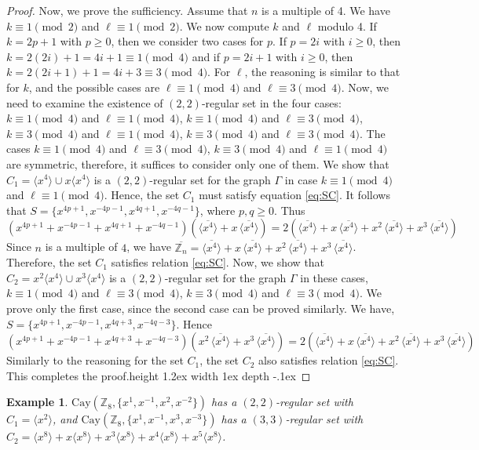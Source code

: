 \documentclass[12pt]{article}
\def\bull{\vrule height 1.2ex width 1ex depth -.1ex }
\newtheorem{example}[formula]{Example}
\begin{document}
\begin{proof}
Now, we prove the sufficiency. Assume that $n$ is a multiple of 4. We have	$k \equiv 1 \pmod{2}$ and $\ell \equiv 1 \pmod{2}$. We now compute $k$ and $\ell$ modulo 4. If  $k = 2p + 1$ with $p \ge 0$, then we consider two cases for $p$.
If $p = 2i$ with $i \ge 0$, then $k = 2(2i) + 1 = 4i + 1 \equiv 1 \pmod{4}$ and if $p = 2i + 1$ with $i \ge 0$, then $k = 2(2i + 1) + 1 = 4i + 3 \equiv 3 \pmod{4}$. For $\ell$, the reasoning is similar to that for $k$, and the possible cases are $\ell \equiv 1 \pmod{4}$ and $\ell \equiv 3 \pmod{4}$. Now, we need to examine the existence of $(2,2)$-regular set in the four cases:\\
$k \equiv 1 \pmod{4}$ and $\ell \equiv 1 \pmod{4}$, $k \equiv 1 \pmod{4}$ and $\ell \equiv 3 \pmod{4}$, $k \equiv 3 \pmod{4}$ and $\ell \equiv 1 \pmod{4}$, $k \equiv 3 \pmod{4}$ and $\ell \equiv 3 \pmod{4}$. The cases  $k \equiv 1 \pmod{4}$ and $\ell \equiv 3 \pmod{4}$, $k \equiv 3 \pmod{4}$ and $\ell \equiv 1 \pmod{4}$ are symmetric, therefore, it suffices to consider only one of them. We show that $C_1 = \langle x^4 \rangle \cup x\langle x^4 \rangle$ is a $(2,2)$-regular set for the graph $\Gamma$ in case $k \equiv 1 \pmod{4}$ and $\ell \equiv 1 \pmod{4}$. Hence, the set $C_1$ must satisfy equation \eqref{eq:SC}. It follows that $S = \{x^{4p+1}, x^{-4p-1}, x^{4q+1}, x^{-4q-1}\}$, where $p,q \ge 0$. Thus
\[
(x^{4p+1} + x^{-4p-1} + x^{4q+1} + x^{-4q-1})
(\overline{\langle x^4 \rangle} + x\,\overline{\langle x^4 \rangle})
= 2 (\overline{\langle x^4 \rangle} + x\,\overline{\langle x^4 \rangle}
+ x^2\,\overline{\langle x^4 \rangle} + x^3\,\overline{\langle x^4 \rangle})
\]
Since $n$ is a multiple of $4$, we have
$\overline{\mathbb{Z}_n}
=
\overline{\langle x^4 \rangle}
+ x\,\overline{\langle x^4 \rangle}
+ x^2\,\overline{\langle x^4 \rangle}
+ x^3\,\overline{\langle x^4 \rangle}$. Therefore, the set $C_1$ satisfies relation \eqref{eq:SC}. Now, we show that $C_2 = x^2\langle x^4\rangle \cup x^3\langle x^4\rangle$ is a $(2,2)$-regular set for the graph $\Gamma$ in these cases,  $k \equiv 1 \pmod{4}$ and $\ell \equiv 3 \pmod{4}$, $k \equiv 3 \pmod{4}$ and $\ell \equiv 3 \pmod{4}$. We prove only the first case, since the second case can be proved similarly. We have, $S = \{x^{4p+1}, x^{-4p-1}, x^{4q+3}, x^{-4q-3}\}$. Hence
\[
(x^{4p+1} + x^{-4p-1} + x^{4q+3} + x^{-4q-3})
(x^2\,\overline{\langle x^4 \rangle} + x^3\,\overline{\langle x^4 \rangle})
= 2 (\overline{\langle x^4 \rangle} + x\,\overline{\langle x^4 \rangle}
+ x^2\,\overline{\langle x^4 \rangle} + x^3\,\overline{\langle x^4 \rangle})
\]
Similarly to the reasoning for the set $C_1$, the set $C_2$ also satisfies relation \eqref{eq:SC}. This completes the proof.\hfill\bull
\end{proof}
\begin{example}\label{ex:Cayley8}
	$\mathrm{Cay}(\mathbb{Z}_8,\{x^1,x^{-1},x^{2},x^{-2}\})$ has a $(2,2)$-regular set with $C_1=\langle x^2 \rangle$, and $\mathrm{Cay}(\mathbb{Z}_8,\{x^1,x^{-1},x^{3},x^{-3}\})$ has a $(3,3)$-regular set with $C_2=\langle x^8 \rangle + x \langle x^8 \rangle + x^3 \langle x^8 \rangle + x^4 \langle x^8 \rangle + x^5 \langle x^8 \rangle$.
\end{example}
\end{document}
